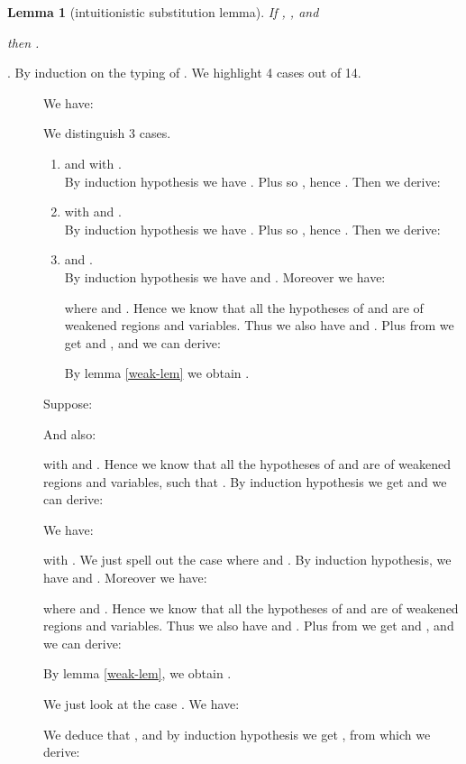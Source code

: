 \documentclass[11pt]{article}
\newtheorem{lemma}[theorem]{Lemma}
\newcommand{\Proof}{\noindent {\sc Proof}. }
\newcommand{\qed}{\hfill}
\begin{document}
\begin{lemma}[intuitionistic substitution lemma]
\label{int-sub-lem}
  If , 
     , and 
      
  then .
\end{lemma}
\Proof
  By induction on the typing of . We highlight 4 cases out of 14.

  \begin{description}

  \item[] We have:
    
    We distinguish 3 cases.
    \begin{enumerate}

    \item 
 and 
 with .\\
     By induction hypothesis we have . Plus
      so , hence
     . Then we derive:
      

    \item 
 with  and 
.\\
      By induction hypothesis we have . Plus  so , hence . Then we derive:
      
    \item 
 and 
.\\ 
By induction hypothesis we have
       and . Moreover we have:
      
      where  and .
Hence we know that all the hypotheses of  and  are of
weakened regions and variables. Thus we also have  and
. Plus from  we get  and
, and we can derive:
      
      By lemma \ref{weak-lem} we obtain .
    \end{enumerate}


\item[] Suppose:
        
      And also:
      
      with  and
      . Hence we know that all the
      hypotheses of  and  are of weakened regions and
      variables, such that . By induction hypothesis we get  and we can derive:
        


  \item[] We have:
    
    with . We just spell out the case where  and
    .
By induction hypothesis, we have  and . Moreover we have:
       
where  and . Hence we know that all the hypotheses of  and 
      are of weakened regions and variables. Thus we also have
       and
      . Plus from  we get
       and , and
      we can derive:
      
By lemma \ref{weak-lem}, we obtain .


 \item[] We just look at the case . We
    have:
    
    We deduce that , and by
    induction hypothesis we get , from which we
    derive:
     \qed
\end{description}
\end{document}
